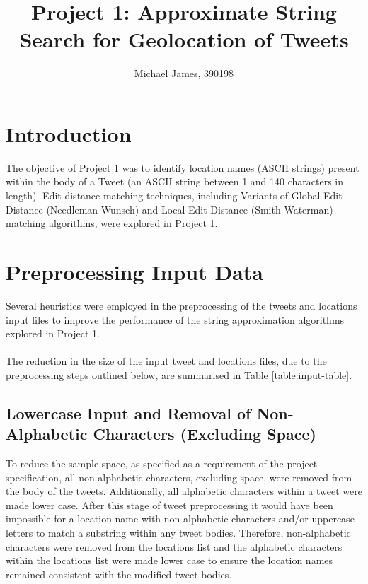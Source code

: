 \documentclass[11pt,a4paper]{article}
\author{Michael James, 390198}
\begin{document}
\title{Project 1: Approximate String Search for Geolocation of Tweets}
\maketitle

\section{Introduction}

The objective of Project 1 was to identify location names (ASCII strings) present within the body of a Tweet (an ASCII string between 1 and 140 characters in length). Edit distance matching techniques, including Variants of Global Edit Distance (Needleman-Wunsch) and Local Edit Distance (Smith-Waterman) matching algorithms, were explored in Project 1. 

\section{Preprocessing Input Data}  

Several heuristics were employed in the preprocessing of the tweets and locations input files to improve the performance of the string approximation algorithms explored in Project 1.\\\\
The reduction in the size of the input tweet and locations files, due to the preprocessing steps outlined below, are summarised in Table \ref{table:input-table}.

\subsection{Lowercase Input and Removal of Non-Alphabetic Characters (Excluding Space)}
\label{subsec:alpha}

To reduce the sample space, as specified as a requirement of the project specification, all non-alphabetic characters, excluding space, were removed from the body of the tweets. Additionally, all alphabetic characters within a tweet were made lower case. After this stage of tweet preprocessing it would have been impossible for a location name with non-alphabetic characters and/or uppercase letters to match a substring within any tweet bodies. Therefore, non-alphabetic characters were removed from the locations list and the alphabetic characters within the locations list were made lower case to ensure the location names remained consistent with the modified tweet bodies.
\end{document}
